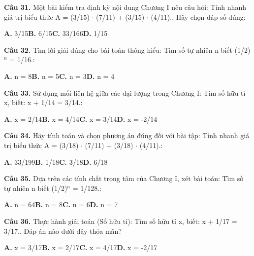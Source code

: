 \documentclass[11pt,a4paper]{article}
\begin{document}
\textbf{\color{primary} Câu 31.} Một bài kiểm tra định kỳ nội dung Chương I nêu câu hỏi: Tính nhanh giá trị biểu thức A = (3/15) $\cdot$ (7/11) + (3/15) $\cdot$ (4/11).. Hãy chọn đáp số đúng:\par
\hspace*{1.5em}\textbf{A.} 3/15\quad\quad \textbf{B.} 6/15\quad\quad \textbf{C.} 33/166\quad\quad \textbf{D.} 1/15\par\vspace{2pt}
\textbf{\color{primary} Câu 32.} Tìm lời giải đúng cho bài toán thông hiểu: Tìm số tự nhiên n biết (1/2)$^{n}$ = 1/16.:\par
\hspace*{1.5em}\textbf{A.} n = 8\quad\quad \textbf{B.} n = 5\quad\quad \textbf{C.} n = 3\quad\quad \textbf{D.} n = 4\par\vspace{2pt}
\textbf{\color{primary} Câu 33.} Sử dụng mối liên hệ giữa các đại lượng trong Chương I: Tìm số hữu tỉ x, biết: x + 1/14 = 3/14.:\par
\hspace*{1.5em}\textbf{A.} x = 2/14\quad\quad \textbf{B.} x = 4/14\quad\quad \textbf{C.} x = 3/14\quad\quad \textbf{D.} x = -2/14\par\vspace{2pt}
\textbf{\color{primary} Câu 34.} Hãy tính toán và chọn phương án đúng đối với bài tập: Tính nhanh giá trị biểu thức A = (3/18) $\cdot$ (7/11) + (3/18) $\cdot$ (4/11).:\par
\hspace*{1.5em}\textbf{A.} 33/199\quad\quad \textbf{B.} 1/18\quad\quad \textbf{C.} 3/18\quad\quad \textbf{D.} 6/18\par\vspace{2pt}
\textbf{\color{primary} Câu 35.} Dựa trên các tính chất trọng tâm của Chương I, xét bài toán: Tìm số tự nhiên n biết (1/2)$^{n}$ = 1/128.:\par
\hspace*{1.5em}\textbf{A.} n = 64\quad\quad \textbf{B.} n = 8\quad\quad \textbf{C.} n = 6\quad\quad \textbf{D.} n = 7\par\vspace{2pt}
\textbf{\color{primary} Câu 36.} Thực hành giải toán (Số hữu tỉ): Tìm số hữu tỉ x, biết: x + 1/17 = 3/17.. Đáp án nào dưới đây thỏa mãn?\par
\hspace*{1.5em}\textbf{A.} x = 3/17\quad\quad \textbf{B.} x = 2/17\quad\quad \textbf{C.} x = 4/17\quad\quad \textbf{D.} x = -2/17\par\vspace{2pt}
\end{document}
